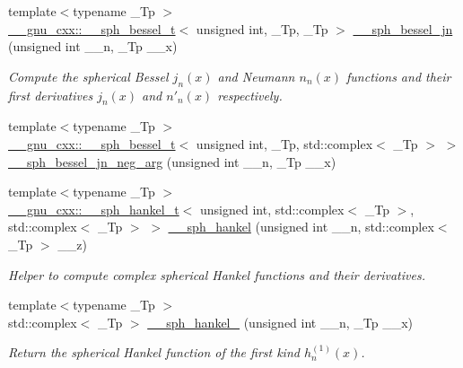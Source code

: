 \begin{DoxyCompactItemize}
{\footnotesize template$<$typename \+\_\+\+Tp $>$ }\\\hyperlink{struct____gnu__cxx_1_1____sph__bessel__t}{\+\_\+\+\_\+gnu\+\_\+cxx\+::\+\_\+\+\_\+sph\+\_\+bessel\+\_\+t}$<$ unsigned int, \+\_\+\+Tp, \+\_\+\+Tp $>$ \hyperlink{namespacestd_1_1____detail_afd4f4f072924a9396676c437135c27f9}{\+\_\+\+\_\+sph\+\_\+bessel\+\_\+jn} (unsigned int \+\_\+\+\_\+n, \+\_\+\+Tp \+\_\+\+\_\+x)
\begin{DoxyCompactList}\small\item\em Compute the spherical Bessel $ j_n(x) $ and Neumann $ n_n(x) $ functions and their first derivatives $ j_n(x) $ and $ n'_n(x) $ respectively. \end{DoxyCompactList}\item 
{\footnotesize template$<$typename \+\_\+\+Tp $>$ }\\\hyperlink{struct____gnu__cxx_1_1____sph__bessel__t}{\+\_\+\+\_\+gnu\+\_\+cxx\+::\+\_\+\+\_\+sph\+\_\+bessel\+\_\+t}$<$ unsigned int, \+\_\+\+Tp, std\+::complex$<$ \+\_\+\+Tp $>$ $>$ \hyperlink{namespacestd_1_1____detail_a8c2a1782e4030a517568aaebecb09f9d}{\+\_\+\+\_\+sph\+\_\+bessel\+\_\+jn\+\_\+neg\+\_\+arg} (unsigned int \+\_\+\+\_\+n, \+\_\+\+Tp \+\_\+\+\_\+x)
\item 
{\footnotesize template$<$typename \+\_\+\+Tp $>$ }\\\hyperlink{struct____gnu__cxx_1_1____sph__hankel__t}{\+\_\+\+\_\+gnu\+\_\+cxx\+::\+\_\+\+\_\+sph\+\_\+hankel\+\_\+t}$<$ unsigned int, std\+::complex$<$ \+\_\+\+Tp $>$, std\+::complex$<$ \+\_\+\+Tp $>$ $>$ \hyperlink{namespacestd_1_1____detail_a1babbc6df4e260ad0e828044c9f33ca1}{\+\_\+\+\_\+sph\+\_\+hankel} (unsigned int \+\_\+\+\_\+n, std\+::complex$<$ \+\_\+\+Tp $>$ \+\_\+\+\_\+z)
\begin{DoxyCompactList}\small\item\em Helper to compute complex spherical Hankel functions and their derivatives. \end{DoxyCompactList}\item 
{\footnotesize template$<$typename \+\_\+\+Tp $>$ }\\std\+::complex$<$ \+\_\+\+Tp $>$ \hyperlink{namespacestd_1_1____detail_adcc174fe4cb03d428f19abcae8012b50}{\+\_\+\+\_\+sph\+\_\+hankel\+\_} (unsigned int \+\_\+\+\_\+n, \+\_\+\+Tp \+\_\+\+\_\+x)
\begin{DoxyCompactList}\small\item\em Return the spherical Hankel function of the first kind $ h^{(1)}_n(x) $. \end{DoxyCompactList}\item 

\end{DoxyCompactItemize}
